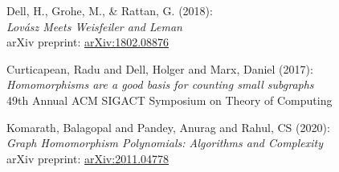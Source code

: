 \label{Bibliography}	%
\begin{thebibliography}{9}

  Dell, H., Grohe, M., \& Rattan, G. (2018):\\
  \textit{Lov\'asz Meets Weisfeiler and Leman}\\
  arXiv preprint: \href{https://arxiv.org/pdf/1802.08876.pdf}{arXiv:1802.08876}


  Curticapean, Radu and Dell, Holger and Marx, Daniel (2017): \\
  \textit{Homomorphisms are a good basis for counting small subgraphs}\\
  49th Annual ACM SIGACT Symposium on Theory of Computing


    Komarath, Balagopal and Pandey, Anurag and Rahul, CS (2020):\\
    \textit{Graph Homomorphism Polynomials: Algorithms and Complexity}\\
    arXiv preprint: \href{https://arxiv.org/pdf/2011.04778.pdf}{arXiv:2011.04778}



  
\end{thebibliography}
